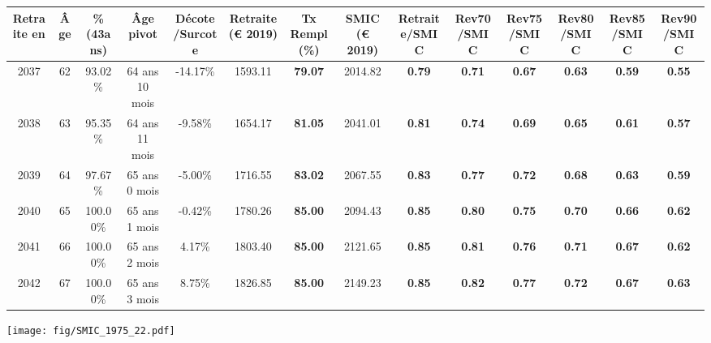 \begin{adjustbox}{max width=\textwidth} 
\begin{tabular}[htb]{|c|c||c|c|c||c|c||c||c|c|c|c|c|c|} 
\hline 
 Retraite en &  Âge &  \%(43ans) &  Âge pivot &  Décote/Surcote &  Retraite (\euro{} 2019) &  Tx Rempl(\%) &  SMIC (\euro{} 2019) &  Retraite/SMIC &  Rev70/SMIC &  Rev75/SMIC &  Rev80/SMIC &  Rev85/SMIC &  Rev90/SMIC \\ 
\hline \hline 
 2037 &  62 &  93.02\% &  64 ans 10 mois &  -14.17\% &  1593.11 &  {\bf 79.07} &  2014.82 &  {\bf {\color{red} 0.79}} &  {\bf {\color{red} 0.71}} &  {\bf {\color{red} 0.67}} &  {\bf {\color{red} 0.63}} &  {\bf {\color{red} 0.59}} &  {\bf {\color{red} 0.55}} \\ 
\hline 
 2038 &  63 &  95.35\% &  64 ans 11 mois &  -9.58\% &  1654.17 &  {\bf 81.05} &  2041.01 &  {\bf {\color{red} 0.81}} &  {\bf {\color{red} 0.74}} &  {\bf {\color{red} 0.69}} &  {\bf {\color{red} 0.65}} &  {\bf {\color{red} 0.61}} &  {\bf {\color{red} 0.57}} \\ 
\hline 
 2039 &  64 &  97.67\% &  65 ans 0 mois &  -5.00\% &  1716.55 &  {\bf 83.02} &  2067.55 &  {\bf {\color{red} 0.83}} &  {\bf {\color{red} 0.77}} &  {\bf {\color{red} 0.72}} &  {\bf {\color{red} 0.68}} &  {\bf {\color{red} 0.63}} &  {\bf {\color{red} 0.59}} \\ 
\hline 
 2040 &  65 &  100.00\% &  65 ans 1 mois &  -0.42\% &  1780.26 &  {\bf 85.00} &  2094.43 &  {\bf {\color{red} 0.85}} &  {\bf {\color{red} 0.80}} &  {\bf {\color{red} 0.75}} &  {\bf {\color{red} 0.70}} &  {\bf {\color{red} 0.66}} &  {\bf {\color{red} 0.62}} \\ 
\hline 
 2041 &  66 &  100.00\% &  65 ans 2 mois &  4.17\% &  1803.40 &  {\bf 85.00} &  2121.65 &  {\bf {\color{red} 0.85}} &  {\bf {\color{red} 0.81}} &  {\bf {\color{red} 0.76}} &  {\bf {\color{red} 0.71}} &  {\bf {\color{red} 0.67}} &  {\bf {\color{red} 0.62}} \\ 
\hline 
 2042 &  67 &  100.00\% &  65 ans 3 mois &  8.75\% &  1826.85 &  {\bf 85.00} &  2149.23 &  {\bf {\color{red} 0.85}} &  {\bf {\color{red} 0.82}} &  {\bf {\color{red} 0.77}} &  {\bf {\color{red} 0.72}} &  {\bf {\color{red} 0.67}} &  {\bf {\color{red} 0.63}} \\ 
\hline 
\hline 
\end{tabular} 
\end{adjustbox} 
 
 \vspace{0.1cm} 

 \begin{center}\texttt{[image: fig/SMIC\_1975\_22.pdf]}\end{center} \label{fig/SMIC_1975_22.pdf} 

